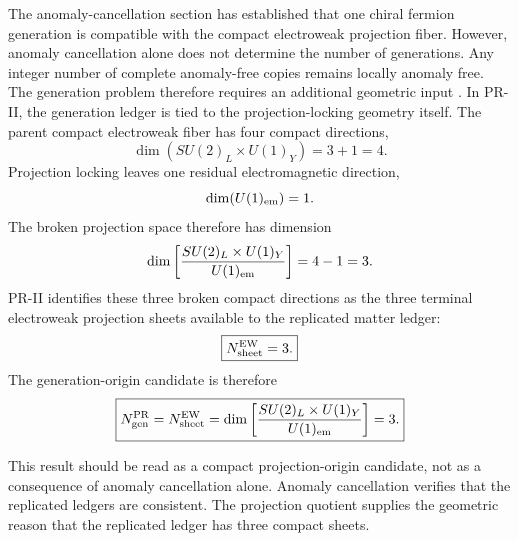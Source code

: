\documentclass[11pt]{article}
\begin{document}
The anomaly-cancellation section has established that one chiral fermion generation is compatible with the compact electroweak projection fiber. However, anomaly cancellation alone does not determine the number of generations. Any integer number of complete anomaly-free copies remains locally anomaly free. The generation problem therefore requires an additional geometric input \cite{Harari1979, Shupe1979}. In PR-II, the generation ledger is tied to the projection-locking geometry itself. The parent compact electroweak fiber has four compact directions,
\begin{equation}
\dim\!\left(
SU(2)_L\times U(1)_Y
\right)
=
3+1
=
4.
\end{equation}
Projection locking leaves one residual electromagnetic direction,
\begin{equation}
\dim\!\left(
U(1)_{\rm em}
\right)
=
1.
\end{equation}
The broken projection space therefore has dimension
\begin{equation}
\dim
\left[
\frac{
SU(2)_L\times U(1)_Y
}{
U(1)_{\rm em}
}
\right]
=
4-1
=
3.
\end{equation}
PR-II identifies these three broken compact directions as the three terminal electroweak projection sheets available to the replicated matter ledger:
\begin{equation}
\boxed{
N_{\rm sheet}^{\rm EW}
=
3.
}
\end{equation}
The generation-origin candidate is therefore
\begin{equation}
\boxed{
N_{\rm gen}^{\rm PR}
=
N_{\rm sheet}^{\rm EW}
=
\dim
\left[
\frac{
SU(2)_L\times U(1)_Y
}{
U(1)_{\rm em}
}
\right]
=
3.
}
\end{equation}

This result should be read as a compact projection-origin candidate, not as a consequence of anomaly cancellation alone. 
Anomaly cancellation verifies that the replicated ledgers are consistent. 
The projection quotient supplies the geometric reason that the replicated ledger has three compact sheets.
\end{document}
